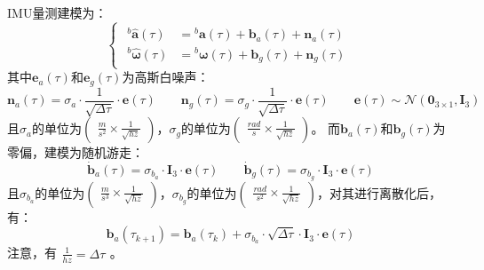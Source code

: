 \documentclass[12pt, onecolumn]{article}
\newcommand\normf{\fangsong}
\begin{document}
	\section{\normf{因子加权}}
	IMU量测建模为：
	\begin{equation}
	\begin{cases}
	\begin{aligned}
		{^{b}}\hat{\boldsymbol{a}}(\tau)&
		={^{b}}\boldsymbol{a}(\tau)+\boldsymbol{b}_a(\tau)+\boldsymbol{n}_a(\tau)
		\\
		{^{b}}\hat{\boldsymbol{\omega}}(\tau)&
		={^{b}}\boldsymbol{\omega}(\tau)+\boldsymbol{b}_g(\tau)+\boldsymbol{n}_g(\tau)
		\end{aligned}
	\end{cases}
	\end{equation}
	其中$\boldsymbol{e}_a(\tau)$和$\boldsymbol{e}_g(\tau)$为高斯白噪声：
	\begin{equation}
	\boldsymbol{n}_a(\tau)=\sigma_a\cdot\frac{1}{\sqrt{\Delta \tau}}\cdot\boldsymbol{e}(\tau)
	\qquad
	\boldsymbol{n}_g(\tau)=\sigma_g\cdot\frac{1}{\sqrt{\Delta \tau}}\cdot\boldsymbol{e}(\tau)
	\qquad
	\boldsymbol{e}(\tau)\sim\mathcal{N}(\boldsymbol{0}_{3\times 1},\boldsymbol{I}_3)
	\end{equation}
	且$\sigma_a$的单位为$\left( \begin{aligned}
	\frac{m}{s^2}\times\frac{1}{\sqrt{hz}}
	\end{aligned}\right) $，$\sigma_g$的单位为$\left( \begin{aligned}
		\frac{rad}{s}\times\frac{1}{\sqrt{hz}}
		\end{aligned}\right) $。
	而$\boldsymbol{b}_a(\tau)$和$\boldsymbol{b}_g(\tau)$为零偏，建模为随机游走：
	\begin{equation}
	\dot{\boldsymbol{b}}_a(\tau)=\sigma_{b_a}\cdot\boldsymbol{I}_3\cdot\boldsymbol{e}(\tau)
	\qquad
	\dot{\boldsymbol{b}}_g(\tau)=\sigma_{b_g}\cdot\boldsymbol{I}_3\cdot\boldsymbol{e}(\tau)
	\end{equation}
	且$\sigma_{b_a}$的单位为$\left( \begin{aligned}
		\frac{m}{s^3}\times\frac{1}{\sqrt{hz}}
		\end{aligned}\right) $，$\sigma_{b_g}$的单位为$\left( \begin{aligned}
			\frac{rad}{s^2}\times\frac{1}{\sqrt{hz}}
			\end{aligned}\right) $，对其进行离散化后，有：
	\begin{equation}
	{\boldsymbol{b}}_a(\tau_{k+1})={\boldsymbol{b}}_a(\tau_{k})+\sigma_{b_a}\cdot\sqrt{\Delta \tau}\cdot\boldsymbol{I}_3\cdot\boldsymbol{e}(\tau)
	\end{equation}
	注意，有$\begin{aligned}
	\frac{1}{hz}=\Delta \tau
	\end{aligned}$。
	
\end{document}
